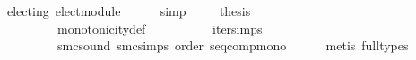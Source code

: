 \begin{isabellebody}
\ {}{\isacharcolon}{\kern0pt}\ {\isachardoublequoteopen}electing\ elect{\isacharunderscore}{\kern0pt}module{\isachardoublequoteclose}\isanewline
\ \ \ \ \isamarkupfalse%
\ simp\ \isanewline
\isanewline
\ \ \isamarkupfalse%
\ {\isacharquery}{\kern0pt}thesis\isanewline
\ \ \ \ \isamarkupfalse%
\ {}\ {}\ {}\ {}\isanewline
\ \ \ \ \ \ \ \ \ \ monotonicity{\isacharunderscore}{\kern0pt}def\isanewline
\ \ \ \ \ \ \ \ \ \ iter{\isachardot}{\kern0pt}simps\isanewline
\ \ \ \ \ \ \ \ \ \ smc{\isacharunderscore}{\kern0pt}sound\ smc{\isachardot}{\kern0pt}simps\ order\ seq{\isacharunderscore}{\kern0pt}comp{\isacharunderscore}{\kern0pt}mono\isanewline
\ \ \ \ \isamarkupfalse%
\ {\isacharparenleft}{\kern0pt}metis\ {\isacharparenleft}{\kern0pt}full{\isacharunderscore}{\kern0pt}types{\isacharparenright}{\kern0pt}{\isacharparenright}{\kern0pt}\isanewline
{}\isamarkupfalse%
%
\endisatagproof
{\isafoldproof}%
%
\isadelimproof
\isanewline
%
\endisadelimproof
%
\isadelimtheory
\isanewline
%
\endisadelimtheory
%
\isatagtheory
{}\isamarkupfalse%
%
\endisatagtheory
{\isafoldtheory}%
%
\isadelimtheory
%
\endisadelimtheory
%
\end{isabellebody}%
\endinput

